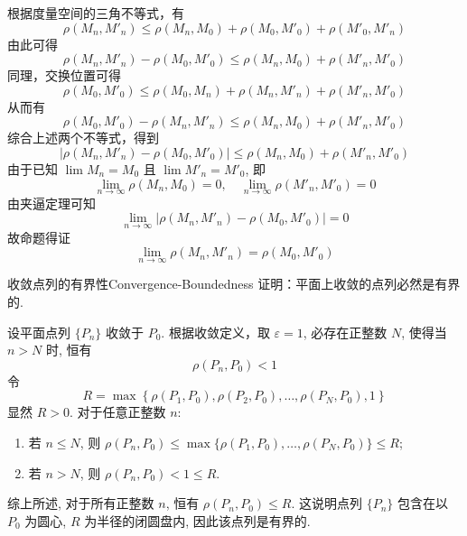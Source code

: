 \begin{myproof}
    根据度量空间的三角不等式，有
    \begin{equation*}
        \rho(M_n, M'_n) \le \rho(M_n, M_0) + \rho(M_0, M'_0) + \rho(M'_0, M'_n)
    \end{equation*}
    由此可得
    \begin{equation*}
        \rho(M_n, M'_n) - \rho(M_0, M'_0) \le \rho(M_n, M_0) + \rho(M'_n, M'_0)
    \end{equation*}
    同理，交换位置可得
    \begin{equation*}
        \rho(M_0, M'_0) \le \rho(M_0, M_n) + \rho(M_n, M'_n) + \rho(M'_n, M'_0)
    \end{equation*}
    从而有
    \begin{equation*}
        \rho(M_0, M'_0) - \rho(M_n, M'_n) \le \rho(M_n, M_0) + \rho(M'_n, M'_0)
    \end{equation*}
    综合上述两个不等式，得到
    \begin{equation*}
        |\rho(M_n, M'_n) - \rho(M_0, M'_0)| \le \rho(M_n, M_0) + \rho(M'_n, M'_0)
    \end{equation*}
    由于已知 $\lim M_n = M_0$ 且 $\lim M'_n = M'_0$, 即
    \begin{equation*}
        \lim_{n \to \infty} \rho(M_n, M_0) = 0, \quad \lim_{n \to \infty} \rho(M'_n, M'_0) = 0
    \end{equation*}
    由夹逼定理可知
    \begin{equation*}
        \lim_{n \to \infty} |\rho(M_n, M'_n) - \rho(M_0, M'_0)| = 0
    \end{equation*}
    故命题得证
    \begin{equation*}
        \lim_{n \to \infty} \rho(M_n, M'_n) = \rho(M_0, M'_0)
    \end{equation*}
\end{myproof}


\begin{problem}{收敛点列的有界性}{Convergence-Boundedness}
    证明：平面上收敛的点列必然是有界的.
\end{problem}

\begin{myproof}
    设平面点列 $\{P_n\}$ 收敛于 $P_0$.
    根据收敛定义，取 $\varepsilon = 1$, 必存在正整数 $N$, 使得当 $n > N$ 时, 恒有
    \begin{equation*}
        \rho(P_n, P_0) < 1
    \end{equation*}
    令
    \begin{equation*}
        R = \max \left\{ \rho(P_1, P_0), \rho(P_2, P_0), \dots, \rho(P_N, P_0), 1 \right\}
    \end{equation*}
    显然 $R > 0$. 对于任意正整数 $n$:
    \begin{enumerate}
        \item 若 $n \le N$, 则 $\rho(P_n, P_0) \le \max \{ \rho(P_1, P_0), \dots, \rho(P_N, P_0) \} \le R$;
        \item 若 $n > N$, 则 $\rho(P_n, P_0) < 1 \le R$.
    \end{enumerate}
    综上所述, 对于所有正整数 $n$, 恒有 $\rho(P_n, P_0) \le R$.
    这说明点列 $\{P_n\}$ 包含在以 $P_0$ 为圆心, $R$ 为半径的闭圆盘内, 因此该点列是有界的.
\end{myproof}



